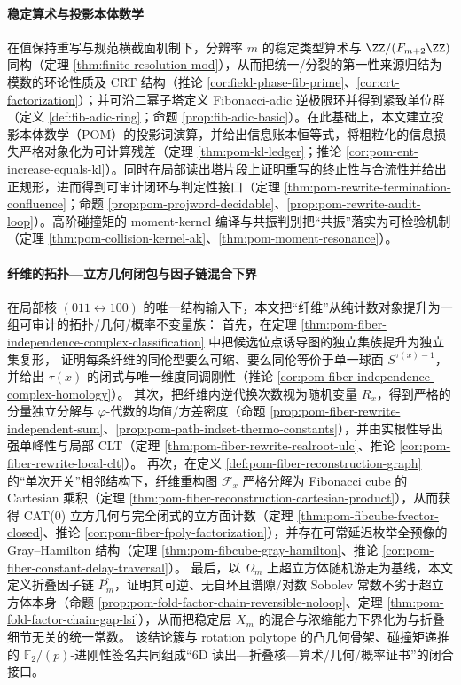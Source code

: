 \paragraph{稳定算术与投影本体数学}
在值保持重写与规范横截面机制下，分辨率 \(m\) 的稳定类型算术与 \(\ZZ/(F_{m+2}\ZZ)\) 同构（定理 \ref{thm:finite-resolution-mod}），从而把统一/分裂的第一性来源归结为模数的环论性质及 CRT 结构（推论 \ref{cor:field-phase-fib-prime}、\ref{cor:crt-factorization}）；并可沿二幂子塔定义 Fibonacci-adic 逆极限环并得到紧致单位群（定义 \ref{def:fib-adic-ring}；命题 \ref{prop:fib-adic-basic}）。在此基础上，本文建立投影本体数学（POM）的投影词演算，并给出信息账本恒等式，将粗粒化的信息损失严格对象化为可计算残差（定理 \ref{thm:pom-kl-ledger}；推论 \ref{cor:pom-ent-increase-equals-kl}）。同时在局部读出塔片段上证明重写的终止性与合流性并给出正规形，进而得到可审计闭环与判定性接口（定理 \ref{thm:pom-rewrite-termination-confluence}；命题 \ref{prop:pom-projword-decidable}、\ref{prop:pom-rewrite-audit-loop}）。高阶碰撞矩的 moment-kernel 编译与共振判别把“共振”落实为可检验机制（定理 \ref{thm:pom-collision-kernel-ak}、\ref{thm:pom-moment-resonance}）。

\paragraph{纤维的拓扑—立方几何闭包与因子链混合下界}
在局部核 \((011\leftrightarrow 100)\) 的唯一结构输入下，本文把“纤维”从纯计数对象提升为一组可审计的拓扑/几何/概率不变量族：
首先，在定理 \ref{thm:pom-fiber-independence-complex-classification} 中把候选位点诱导图的独立集族提升为独立集复形，
证明每条纤维的同伦型要么可缩、要么同伦等价于单一球面 \(S^{\tau(x)-1}\)，并给出 \(\tau(x)\) 的闭式与唯一维度同调刚性（推论 \ref{cor:pom-fiber-independence-complex-homology}）。
其次，把纤维内逆代换次数视为随机变量 \(R_x\)，得到严格的分量独立分解与 \(\varphi\)-代数的均值/方差密度（命题 \ref{prop:pom-fiber-rewrite-independent-sum}、\ref{prop:pom-path-indset-thermo-constants}），并由实根性导出强单峰性与局部 CLT（定理 \ref{thm:pom-fiber-rewrite-realroot-ulc}、推论 \ref{cor:pom-fiber-rewrite-local-clt}）。
再次，在定义 \ref{def:pom-fiber-reconstruction-graph} 的“单次开关”相邻结构下，纤维重构图 \(\mathcal F_x\) 严格分解为 Fibonacci cube 的 Cartesian 乘积（定理 \ref{thm:pom-fiber-reconstruction-cartesian-product}），从而获得 CAT(0) 立方几何与完全闭式的立方面计数（定理 \ref{thm:pom-fibcube-fvector-closed}、推论 \ref{cor:pom-fiber-fpoly-factorization}），并存在可常延迟枚举全预像的 Gray--Hamilton 结构（定理 \ref{thm:pom-fibcube-gray-hamilton}、推论 \ref{cor:pom-fiber-constant-delay-traversal}）。
最后，以 \(\Omega_m\) 上超立方体随机游走为基线，本文定义折叠因子链 \(\overline P^{\square}_m\)，证明其可逆、无自环且谱隙/对数 Sobolev 常数不劣于超立方体本身（命题 \ref{prop:pom-fold-factor-chain-reversible-noloop}、定理 \ref{thm:pom-fold-factor-chain-gap-lsi}），从而把稳定层 \(X_m\) 的混合与浓缩能力下界化为与折叠细节无关的统一常数。
该结论簇与 rotation polytope 的凸几何骨架、碰撞矩递推的 \(\mathbb F_2/(p)\)-进刚性签名共同组成“6D 读出—折叠核—算术/几何/概率证书”的闭合接口。

